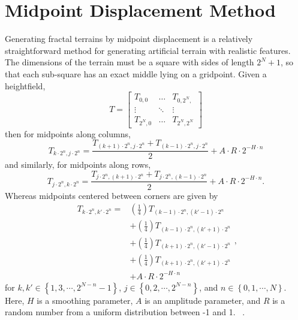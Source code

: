 \documentclass[11pt,twocolumn]{article}
\begin{document}
	\section{Midpoint Displacement Method}
	\label{sec:midpoint}
	Generating fractal terrains by midpoint displacement is a relatively straightforward method for generating artificial terrain with realistic features. The dimensions of the terrain must be a square with sides of length $2^{N}+1$, so that each sub-square has an exact middle lying on a gridpoint. Given a heightfield,
	\begin{equation}
		T = \left[ \begin{matrix}
		T_{0,0} & \ldots & T_{0,2^{N},} \\
		\vdots  &  \ddots & \vdots \\
		T_{2^{N},0} & \ldots & T_{2^{N},2^{N}}
		\end{matrix} \right]
	\end{equation}
	then for midpoints along columns,
	\begin{equation}
		T_{k \cdot 2^{n},j \cdot 2^{n}} = \frac{T_{(k+1) \cdot 2^{n},j \cdot 2^{n}} + T_{(k-1) \cdot 2^{n},j \cdot 2^{n}}}{2} + A \cdot R \cdot 2^{-H \cdot n}
	\end{equation}
	and similarly, for midpoints along rows,
	\begin{equation}
		T_{j \cdot 2^{n},k \cdot 2^{n}} = \frac{T_{j \cdot 2^{n},(k+1) \cdot 2^{n}} + T_{j \cdot 2^{n},(k-1) \cdot 2^{n}}}{2} + A \cdot R \cdot 2^{-H \cdot n}
	.\end{equation}
	Whereas midpoints centered between corners are given by
	\begin{equation}
		\begin{split}
			T_{k \cdot 2^{n},k' \cdot 2^{n}} =& \left(\frac{1}{4}\right)T_{(k-1) \cdot 2^{n},(k'-1) \cdot 2^{n}} \\
			& + \left(\frac{1}{4}\right)T_{(k-1) \cdot 2^{n},(k'+1) \cdot 2^{n}} \\
			& + \left(\frac{1}{4}\right)T_{(k+1) \cdot 2^{n},(k'-1) \cdot 2^{n}} \\
			& + \left(\frac{1}{4}\right)T_{(k+1) \cdot 2^{n},(k'+1) \cdot 2^{n}} \\
			& + A \cdot R \cdot 2^{-H \cdot n}
		\end{split}
	,\end{equation}
	for $k,k' \in \left\{ 1, 3, \cdots, 2^{N-n}-1 \right\}$,
	$j \in \left\{ 0, 2, \cdots, 2^{N-n} \right\}$, and $n \in \left\{ 0, 1, \cdots, N\right\}$.
	Here, $H$ is a smoothing parameter, $A$ is an amplitude parameter,
	and $R$ is a random number from a uniform distribution between -1 and 1. ~\cite{Miller}.
\end{document}
